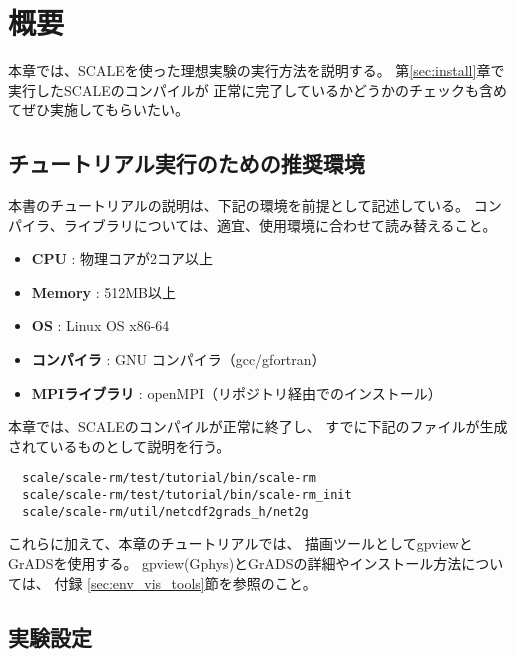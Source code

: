 
\section{概要}

本章では、SCALEを使った理想実験の実行方法を説明する。
第\ref{sec:install}章で実行したSCALEのコンパイルが
正常に完了しているかどうかのチェックも含めてぜひ実施してもらいたい。


\subsection{チュートリアル実行のための推奨環境}
\label{sec:assumed_env}

本書のチュートリアルの説明は、下記の環境を前提として記述している。
コンパイラ、ライブラリについては、適宜、使用環境に合わせて読み替えること。

\begin{itemize}
 \item {\bf CPU} : 物理コアが2コア以上 %
 \item {\bf Memory} : 512MB以上 %
 \item {\bf OS} : Linux OS x86-64  %
 \item {\bf コンパイラ} : GNU コンパイラ（gcc/gfortran）
 \item {\bf MPIライブラリ} : openMPI（リポジトリ経由でのインストール）
\end{itemize}

本章では、SCALEのコンパイルが正常に終了し、
すでに下記のファイルが生成されているものとして説明を行う。
\begin{verbatim} 
  scale/scale-rm/test/tutorial/bin/scale-rm
  scale/scale-rm/test/tutorial/bin/scale-rm_init
  scale/scale-rm/util/netcdf2grads_h/net2g
\end{verbatim}
これらに加えて、本章のチュートリアルでは、
描画ツールとしてgpviewとGrADSを使用する。
gpview(Gphys)とGrADSの詳細やインストール方法については、
付録 \ref{sec:env_vis_tools}節を参照のこと。


\subsection{実験設定}

